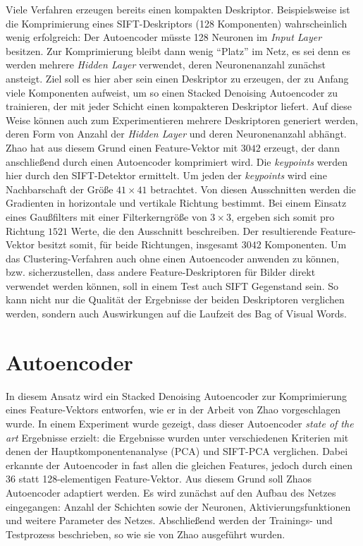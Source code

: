 Viele Verfahren erzeugen bereits einen kompakten Deskriptor. Beispielsweise ist die Komprimierung eines SIFT-Deskriptors (128 Komponenten) wahrscheinlich wenig erfolgreich: Der Autoencoder müsste 128 Neuronen im \textit{Input Layer} besitzen. Zur Komprimierung bleibt dann wenig \enquote{Platz} im Netz, es sei denn es werden mehrere \textit{Hidden Layer} verwendet, deren Neuronenanzahl zunächst ansteigt. Ziel soll es hier aber sein einen Deskriptor zu erzeugen, der zu Anfang viele Komponenten aufweist, um so einen Stacked Denoising Autoencoder zu trainieren, der mit jeder Schicht einen kompakteren Deskriptor liefert. Auf diese Weise können auch zum Experimentieren mehrere Deskriptoren generiert werden, deren Form von Anzahl der \textit{Hidden Layer} und deren Neuronenanzahl abhängt.\newline
Zhao \cite{aed2016} hat aus diesem Grund einen Feature-Vektor mit $3042$ erzeugt, der dann anschließend durch einen Autoencoder komprimiert wird. Die \textit{keypoints} werden hier durch den SIFT-Detektor ermittelt. Um jeden der \textit{keypoints} wird eine Nachbarschaft der Größe $41 \times 41$ betrachtet. Von diesen Ausschnitten werden die Gradienten in horizontale und vertikale Richtung bestimmt. Bei einem Einsatz eines Gaußfilters mit einer Filterkerngröße von $3 \times 3$, ergeben sich somit pro Richtung $1521$ Werte, die den Ausschnitt beschreiben. Der resultierende Feature-Vektor besitzt somit, für beide Richtungen, insgesamt $3042$ Komponenten.\newline
Um das Clustering-Verfahren auch ohne einen Autoencoder anwenden zu können, bzw. sicherzustellen, dass andere Feature-Deskriptoren für Bilder direkt verwendet werden können, soll in einem Test auch SIFT Gegenstand sein. So kann nicht nur die Qualität der Ergebnisse der beiden Deskriptoren verglichen werden, sondern auch Auswirkungen auf die Laufzeit des Bag of Visual Words.

\section{Autoencoder}

In diesem Ansatz wird ein Stacked Denoising Autoencoder zur Komprimierung eines Feature-Vektors entworfen, wie er in der Arbeit von Zhao \cite{aed2016} vorgeschlagen wurde. In einem Experiment wurde gezeigt, dass dieser Autoencoder \textit{state of the art} Ergebnisse erzielt: die Ergebnisse wurden unter verschiedenen Kriterien mit denen der Hauptkomponentenanalyse (PCA) und SIFT-PCA verglichen. Dabei erkannte der Autoencoder in fast allen die gleichen Features, jedoch durch einen 36 statt 128-elementigen Feature-Vektor. Aus diesem Grund soll Zhaos Autoencoder adaptiert werden. \newline
Es wird zunächst auf den Aufbau des Netzes eingegangen: Anzahl der Schichten sowie der Neuronen, Aktivierungsfunktionen und weitere Parameter des Netzes. Abschließend werden der Trainings- und Testprozess beschrieben, so wie sie von Zhao ausgeführt wurden.

